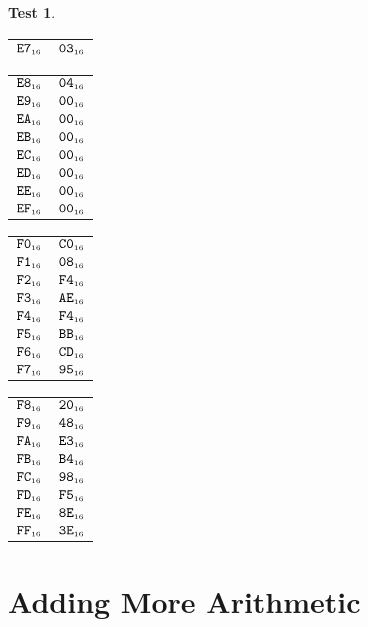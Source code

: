 \documentclass[a4paper,12pt]{article}
\makeatletter
\newcommand{\num}[1]{\texttt{#1}}
\newcommand{\hex}[1]{\num{#1}_{\textup{\tiny 16}}}
\newcommand{\MEM}[1]{\ifthenelse{\equal{#1}{}}{M}{M[#1]}}
\theoremstyle{definition}
\newtheorem{test}{Test}
\newenvironment{memtable}{%
  \begin{trivlist}
    \item
    }{%
    \end{trivlist}}
\newenvironment{memcolumn}{%
  \begin{tabular}{@{}ll@{}}
    \hline}
    {%
    \hline
  \end{tabular}}
\newcommand{\memspace}{\qquad}
\makeatother
\begin{document}
\begin{test}
\begin{memtable}
\begin{memcolumn}
      $\hex{E7}$ & $\hex{03}$ \\
    \end{memcolumn}
    \memspace
    \begin{memcolumn}
      $\hex{E8}$ & $\hex{04}$ \\
      $\hex{E9}$ & $\hex{00}$ \\
      $\hex{EA}$ & $\hex{00}$ \\
      $\hex{EB}$ & $\hex{00}$ \\
      $\hex{EC}$ & $\hex{00}$ \\
      $\hex{ED}$ & $\hex{00}$ \\
      $\hex{EE}$ & $\hex{00}$ \\
      $\hex{EF}$ & $\hex{00}$ \\
    \end{memcolumn}
    \memspace
    \begin{memcolumn}
      $\hex{F0}$ & $\hex{C0}$ \\
      $\hex{F1}$ & $\hex{08}$ \\
      $\hex{F2}$ & $\hex{F4}$ \\
      $\hex{F3}$ & $\hex{AE}$ \\
      $\hex{F4}$ & $\hex{F4}$ \\
      $\hex{F5}$ & $\hex{BB}$ \\
      $\hex{F6}$ & $\hex{CD}$ \\
      $\hex{F7}$ & $\hex{95}$ \\
    \end{memcolumn}
    \memspace
    \begin{memcolumn}
      $\hex{F8}$ & $\hex{20}$ \\
      $\hex{F9}$ & $\hex{48}$ \\
      $\hex{FA}$ & $\hex{E3}$ \\
      $\hex{FB}$ & $\hex{B4}$ \\
      $\hex{FC}$ & $\hex{98}$ \\
      $\hex{FD}$ & $\hex{F5}$ \\
      $\hex{FE}$ & $\hex{8E}$ \\
      $\hex{FF}$ & $\hex{3E}$ \\
    \end{memcolumn}
  \end{memtable}
\end{test}

\section{Adding More Arithmetic}
\end{document}
